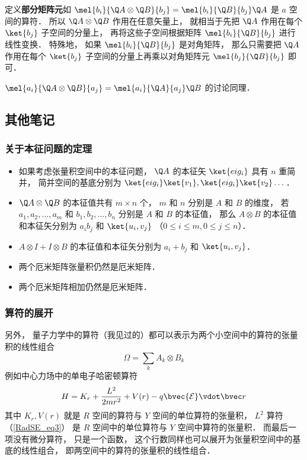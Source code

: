 定义\textbf{部分矩阵元}如 $\mel{b_i}{\Q A \otimes \Q B}{b_j} = \mel{b_i}{\Q B}{b_j} \Q A$ 是 $a$ 空间的算符． 所以 $\Q A \otimes \Q B$ 作用在任意矢量上， 就相当于先把 $\Q A$ 作用在每个 $\ket{b_j}$ 子空间的分量上， 再将这些子空间根据矩阵 $\mel{b_i}{\Q B}{b_j}$ 进行线性变换． 特殊地， 如果 $\mel{b_i}{\Q B}{b_j}$ 是对角矩阵， 那么只需要把 $\Q A$ 作用在每个 $\ket{b_j}$ 子空间的分量上再乘以对角矩阵元 $\mel{b_j}{\Q B}{b_j}$ 即可．

$\mel{a_i}{\Q A \otimes \Q B}{a_j} = \mel{a_i}{\Q A}{a_j} \Q B$ 的讨论同理．

\subsection{其他笔记}

\subsubsection{关于本征问题的定理}%

\begin{itemize}
\item 如果考虑张量积空间中的本征问题， $\Q A$  的本征矢 $\ket{eig_i}$ 具有 $n$ 重简并， 简并空间的基底分别为 $\ket{eig_i}\ket{v_1}, \ket{eig_i}\ket{v_2}\dots$． 

\item $\Q A \otimes \Q B$ 的本征值共有 $m \times n$ 个， $m$ 和 $n$ 分别是 $A$ 和 $B$ 的维度， 若 $a_1, a_2,\dots, a_m$ 和 $b_1, b_2, \dots, b_n$ 分别是 $A$ 和 $B$ 的本征值， 那么 $A \otimes B$ 的本征值和本征矢分别为 $a_i b_j$ 和 $\ket{u_i, v_j}$ （$0 \leqslant i \leqslant m,  0 \leqslant j \leqslant n$）．

\item $A \otimes I + I \otimes B$ 的本征值和本征矢分别为 $a_i + b_j$ 和 $\ket{u_i, v_j}$．

\item 两个厄米矩阵张量积仍然是厄米矩阵．

\item 两个厄米矩阵相加仍然是厄米矩阵．
\end{itemize}

\subsubsection{算符的展开}
另外， 量子力学中的算符（我见过的）都可以表示为两个小空间中的算符的张量积的线性组合
\begin{equation}
\Omega = \sum_k A_k \otimes B_k
\end{equation}
例如中心力场中的单电子哈密顿算符
\begin{equation}
H = K_r + \frac{L^2}{2mr^2} + V(r) - q\bvec{\mathcal{E}} \vdot \bvec r
\end{equation}
其中 $K_r, V(r)$ 就是 $R$ 空间的算符与 $Y$ 空间的单位算符的张量积， $L^2$ 算符（\autoref{RadSE_eq3}） 是 $R$ 空间中的单位算符与 $Y$ 空间中算符的张量积． 而最后一项没有微分算符， 只是一个函数， 这个行数同样也可以展开为张量积空间中的基底的线性组合， 即两空间中的算符的张量积的线性组合．

